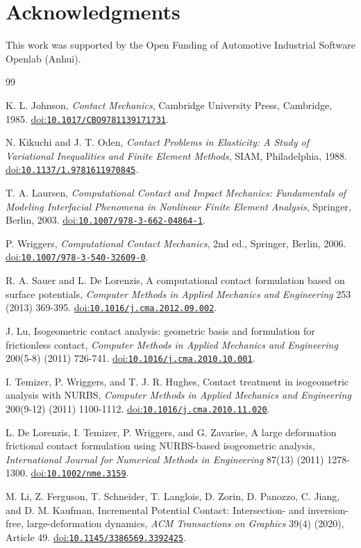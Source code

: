 \documentclass[preprint,12pt]{elsarticle}
\newcommand{\doi}[1]{\href{https://doi.org/#1}{doi:\nolinkurl{#1}}}
\begin{document}
\section*{Acknowledgments}
This work was supported by the Open Funding of Automotive Industrial Software Openlab (Anhui).

\begin{thebibliography}{99}

K. L. Johnson, \emph{Contact Mechanics}, Cambridge University Press, Cambridge, 1985. \doi{10.1017/CBO9781139171731}.

N. Kikuchi and J. T. Oden, \emph{Contact Problems in Elasticity: A Study of Variational Inequalities and Finite Element Methods}, SIAM, Philadelphia, 1988. \doi{10.1137/1.9781611970845}.

T. A. Laursen, \emph{Computational Contact and Impact Mechanics: Fundamentals of Modeling Interfacial Phenomena in Nonlinear Finite Element Analysis}, Springer, Berlin, 2003. \doi{10.1007/978-3-662-04864-1}.

P. Wriggers, \emph{Computational Contact Mechanics}, 2nd ed., Springer, Berlin, 2006. \doi{10.1007/978-3-540-32609-0}.

R. A. Sauer and L. De Lorenzis, A computational contact formulation based on surface potentials, \emph{Computer Methods in Applied Mechanics and Engineering} 253 (2013) 369-395. \doi{10.1016/j.cma.2012.09.002}.

J. Lu, Isogeometric contact analysis: geometric basis and formulation for frictionless contact, \emph{Computer Methods in Applied Mechanics and Engineering} 200(5-8) (2011) 726-741. \doi{10.1016/j.cma.2010.10.001}.

I. Temizer, P. Wriggers, and T. J. R. Hughes, Contact treatment in isogeometric analysis with NURBS, \emph{Computer Methods in Applied Mechanics and Engineering} 200(9-12) (2011) 1100-1112. \doi{10.1016/j.cma.2010.11.020}.

L. De Lorenzis, I. Temizer, P. Wriggers, and G. Zavarise, A large deformation frictional contact formulation using NURBS-based isogeometric analysis, \emph{International Journal for Numerical Methods in Engineering} 87(13) (2011) 1278-1300. \doi{10.1002/nme.3159}.

M. Li, Z. Ferguson, T. Schneider, T. Langlois, D. Zorin, D. Panozzo, C. Jiang, and D. M. Kaufman, Incremental Potential Contact: Intersection- and inversion-free, large-deformation dynamics, \emph{ACM Transactions on Graphics} 39(4) (2020), Article 49. \doi{10.1145/3386569.3392425}.


\end{thebibliography}
\end{document}
